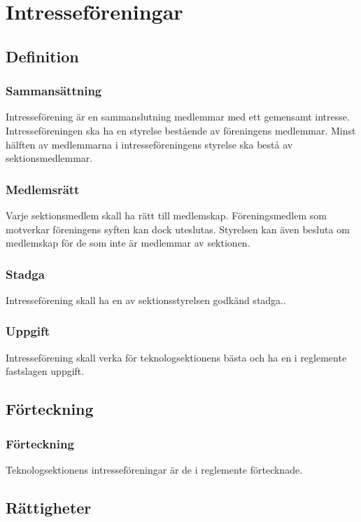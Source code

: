 \section{Intresseföreningar}

\subsection{Definition}

\subsubsection{Sammansättning}
Intresseförening är en sammanslutning medlemmar med ett gemensamt intresse. Intresseföreningen ska ha en styrelse bestående av föreningens medlemmar. Minst hälften av medlemmarna i intresseföreningens styrelse ska bestå av sektionsmedlemmar.

\subsubsection{Medlemsrätt}
Varje sektionsmedlem skall ha rätt till medlemskap. Föreningsmedlem som motverkar föreningens syften kan dock uteslutas. Styrelsen kan även besluta om medlemskap för de som inte är medlemmar av sektionen.

\subsubsection{Stadga}
Intresseförening skall ha en av sektionsstyrelsen godkänd stadga..

\subsubsection{Uppgift}
Intresseförening skall verka för teknologsektionens bästa och ha en i reglemente fastslagen uppgift.

\subsection{Förteckning}

\subsubsection{Förteckning}
Teknologsektionens intresseföreningar är de i reglemente förtecknade.

\subsection{Rättigheter}


